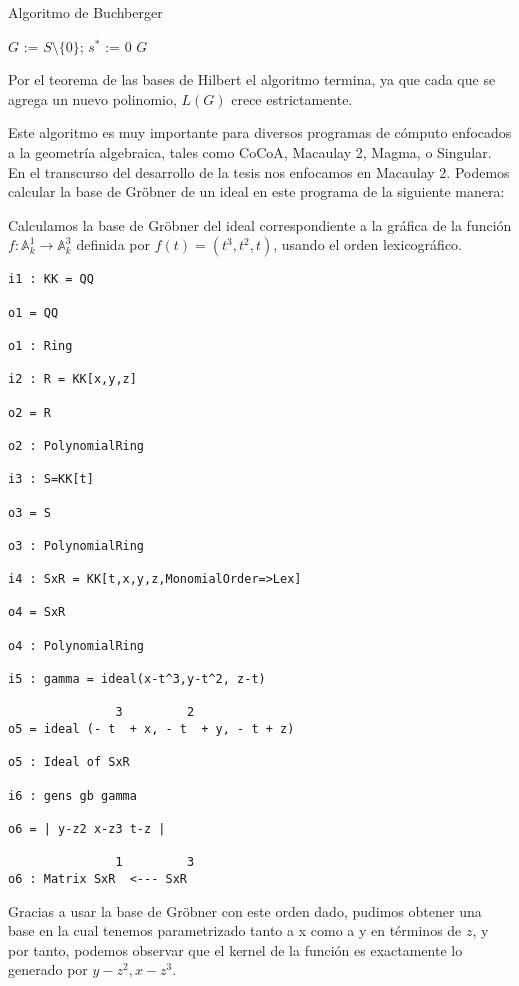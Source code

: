 \begin{algo}Algoritmo de Buchberger


\begin{algorithm}[H]
 $G$ := $S\setminus\{0\}$; $s^*$ := 0\;
 \Return $G$\;
\end{algorithm}
\end{algo}

Por el teorema de las bases de Hilbert el algoritmo termina, ya que cada que se agrega un nuevo polinomio, $L(G)$ crece estrictamente.

Este algoritmo es muy importante para diversos programas de cómputo enfocados a la geometría algebraica, tales como CoCoA, Macaulay 2, Magma, o Singular. En el transcurso del desarrollo de la tesis nos enfocamos en Macaulay 2. Podemos calcular la base de Gröbner de un ideal en este programa de la siguiente manera:

\begin{example} Calculamos la base de Gröbner del ideal correspondiente a la gráfica de la función $f:\mathbb{A}_k^1 \rightarrow \mathbb{A}_k^3 $ definida por $f(t) = (t^3,t^2,t)$, usando el orden lexicográfico.
\begin{lstlisting}
i1 : KK = QQ

o1 = QQ

o1 : Ring

i2 : R = KK[x,y,z]

o2 = R

o2 : PolynomialRing

i3 : S=KK[t]

o3 = S

o3 : PolynomialRing

i4 : SxR = KK[t,x,y,z,MonomialOrder=>Lex]

o4 = SxR

o4 : PolynomialRing

i5 : gamma = ideal(x-t^3,y-t^2, z-t)

               3         2
o5 = ideal (- t  + x, - t  + y, - t + z)

o5 : Ideal of SxR

i6 : gens gb gamma

o6 = | y-z2 x-z3 t-z |

               1         3
o6 : Matrix SxR  <--- SxR
\end{lstlisting}
Gracias a usar la base de Gröbner con este orden dado, pudimos obtener una base en la cual tenemos parametrizado tanto a x como a y en términos de $z$, y por tanto, podemos observar que el kernel de la función es exactamente lo generado por $y - z^2, x - z^3$.
\end{example}